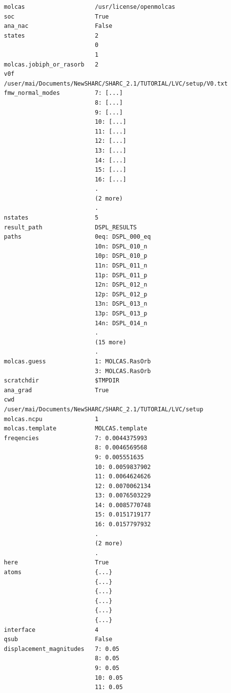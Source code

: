 \documentclass[a4paper,11pt,DIV=15,openany]{scrbook}
\begin{document}
\begin{oframed}
\begin{Verbatim}[commandchars=\\\{\}]
molcas                    /usr/license/openmolcas
soc                       True
ana_nac                   False
states                    2
                          0
                          1
molcas.jobiph_or_rasorb   2
v0f                       /user/mai/Documents/NewSHARC/SHARC_2.1/TUTORIAL/LVC/setup/V0.txt
fmw_normal_modes          7: [...]
                          8: [...]
                          9: [...]
                          10: [...]
                          11: [...]
                          12: [...]
                          13: [...]
                          14: [...]
                          15: [...]
                          16: [...]
                          .
                          (2 more)
                          .
nstates                   5
result_path               DSPL_RESULTS
paths                     0eq: DSPL_000_eq
                          10n: DSPL_010_n
                          10p: DSPL_010_p
                          11n: DSPL_011_n
                          11p: DSPL_011_p
                          12n: DSPL_012_n
                          12p: DSPL_012_p
                          13n: DSPL_013_n
                          13p: DSPL_013_p
                          14n: DSPL_014_n
                          .
                          (15 more)
                          .
molcas.guess              1: MOLCAS.RasOrb
                          3: MOLCAS.RasOrb
scratchdir                $TMPDIR
ana_grad                  True
cwd                       /user/mai/Documents/NewSHARC/SHARC_2.1/TUTORIAL/LVC/setup
molcas.ncpu               1
molcas.template           MOLCAS.template
freqencies                7: 0.0044375993
                          8: 0.0046569568
                          9: 0.005551635
                          10: 0.0059837902
                          11: 0.0064624626
                          12: 0.0070062134
                          13: 0.0076503229
                          14: 0.0085770748
                          15: 0.0151719177
                          16: 0.0157797932
                          .
                          (2 more)
                          .
here                      True
atoms                     {...}
                          {...}
                          {...}
                          {...}
                          {...}
                          {...}
interface                 4
qsub                      False
displacement_magnitudes   7: 0.05
                          8: 0.05
                          9: 0.05
                          10: 0.05
                          11: 0.05

\end{Verbatim}
\end{oframed}
\end{document}
